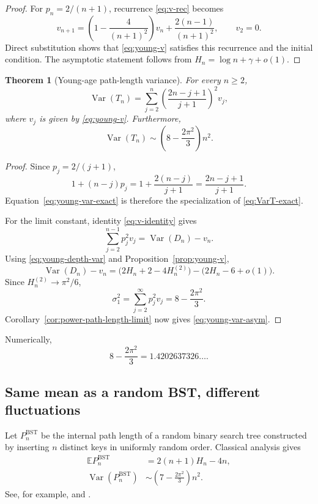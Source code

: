 \documentclass[11pt,a4paper]{article}
\newtheorem{theorem}{Theorem}[section]
\newcommand{\E}{\mathbb{E}}
\newcommand{\Var}{\operatorname{Var}}
\newcommand{\1}{\mathbf{1}}
\begin{document}
\begin{proof}
For $p_n=2/(n+1)$, recurrence \eqref{eq:v-rec} becomes
\[
v_{n+1}
=
\left(1-\frac4{(n+1)^2}\right)v_n
+
\frac{2(n-1)}{(n+1)^2},
\qquad v_2=0.
\]
Direct substitution shows that \eqref{eq:young-v} satisfies this recurrence
and the initial condition.  The asymptotic statement follows from
$H_n=\log n+\gamma+o(1)$.
\end{proof}

\begin{theorem}[Young-age path-length variance]\label{thm:young-var}
For every $n\ge2$,
\begin{equation}\label{eq:young-var-exact}
\Var(T_n)
=
\sum_{j=2}^n
\left(\frac{2n-j+1}{j+1}\right)^2
v_j,
\end{equation}
where $v_j$ is given by \eqref{eq:young-v}.  Furthermore,
\begin{equation}\label{eq:young-var-asym}
\Var(T_n)
\sim
\left(8-\frac{2\pi^2}{3}\right)n^2.
\end{equation}
\end{theorem}

\begin{proof}
Since $p_j=2/(j+1)$,
\[
1+(n-j)p_j
=
1+\frac{2(n-j)}{j+1}
=
\frac{2n-j+1}{j+1}.
\]
Equation~\eqref{eq:young-var-exact} is therefore the specialization of
\eqref{eq:VarT-exact}.

For the limit constant, identity \eqref{eq:v-identity} gives
\[
\sum_{j=2}^{n-1}p_j^2v_j
=
\Var(D_n)-v_n.
\]
Using \eqref{eq:young-depth-var} and Proposition~\ref{prop:young-v},
\[
\Var(D_n)-v_n
=
\bigl(2H_n+2-4H_n^{(2)}\bigr)
-
\bigl(2H_n-6+o(1)\bigr).
\]
Since $H_n^{(2)}\to\pi^2/6$,
\[
\sigma_1^2
=
\sum_{j=2}^\infty p_j^2v_j
=
8-\frac{2\pi^2}{3}.
\]
Corollary~\ref{cor:power-path-length-limit} now gives
\eqref{eq:young-var-asym}.
\end{proof}

Numerically,
\[
8-\frac{2\pi^2}{3}
=
1.4202637326\ldots.
\]

\subsection{Same mean as a random BST, different fluctuations}

Let $P_n^{\mathrm{BST}}$ be the internal path length of a random binary search
tree constructed by inserting $n$ distinct keys in uniformly random order.
Classical analysis gives
\begin{align}
\E P_n^{\mathrm{BST}}
&=
2(n+1)H_n-4n,\label{eq:bst-mean}\\
\Var(P_n^{\mathrm{BST}})
&\sim
\left(7-\frac{2\pi^2}{3}\right)n^2.
\label{eq:bst-var}
\end{align}
See, for example, \citet{Knuth1998} and
\citet{FlajoletSedgewick2009}.
\end{document}
